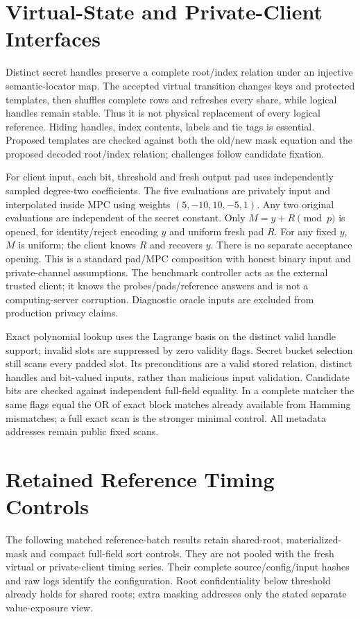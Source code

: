 \section{Virtual-State and Private-Client Interfaces}\label{suppsec:generated_v3_supplement:2}
Distinct secret handles preserve a complete root/index relation under an injective semantic-locator map. The accepted virtual transition changes keys and protected templates, then shuffles complete rows and refreshes every share, while logical handles remain stable. Thus it is not physical replacement of every logical reference. Hiding handles, index contents, labels and tie tags is essential. Proposed templates are checked against both the old/new mask equation and the proposed decoded root/index relation; challenges follow candidate fixation.

For client input, each bit, threshold and fresh output pad uses independently sampled degree-two coefficients. The five evaluations are privately input and interpolated inside MPC using weights $(5,-10,10,-5,1)$. Any two original evaluations are independent of the secret constant. Only $M=y+R\pmod p$ is opened, for identity/reject encoding $y$ and uniform fresh pad $R$. For any fixed $y$, $M$ is uniform; the client knows $R$ and recovers $y$. There is no separate acceptance opening. This is a standard pad/MPC composition with honest binary input and private-channel assumptions. The benchmark controller acts as the external trusted client; it knows the probes/pads/reference answers and is not a computing-server corruption. Diagnostic oracle inputs are excluded from production privacy claims.

Exact polynomial lookup uses the Lagrange basis on the distinct valid handle support; invalid slots are suppressed by zero validity flags. Secret bucket selection still scans every padded slot. Its preconditions are a valid stored relation, distinct handles and bit-valued inputs, rather than malicious input validation. Candidate bits are checked against independent full-field equality. In a complete matcher the same flags equal the OR of exact block matches already available from Hamming mismatches; a full exact scan is the stronger minimal control. All metadata addresses remain public fixed scans.

\section{Retained Reference Timing Controls}\label{suppsec:generated_v3_supplement:3}
The following matched reference-batch results retain shared-root, materialized-mask and compact full-field sort controls. They are not pooled with the fresh virtual or private-client timing series. Their complete source/config/input hashes and raw logs identify the configuration. Root confidentiality below threshold already holds for shared roots; extra masking addresses only the stated separate value-exposure view.

